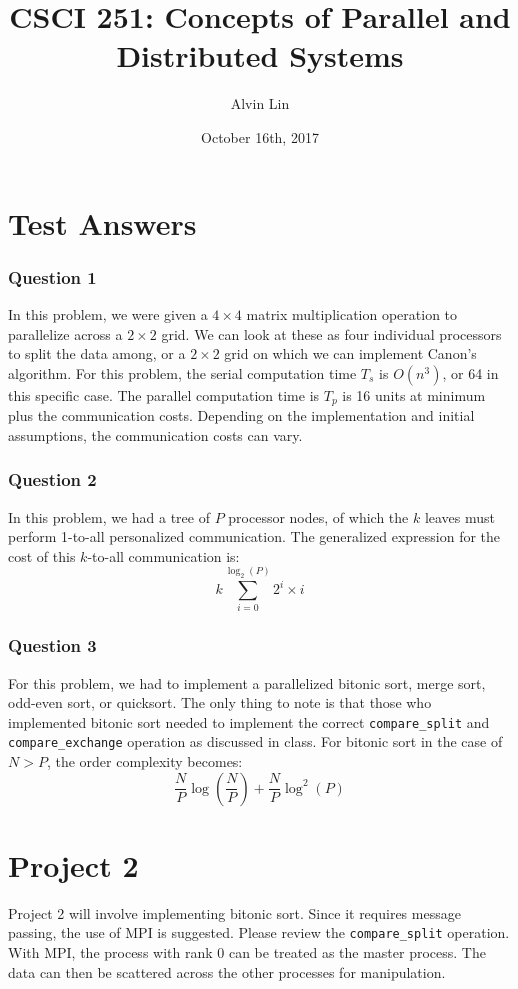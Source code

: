 \documentclass{math}
\title{CSCI 251: Concepts of Parallel and Distributed Systems}
\author{Alvin Lin}
\date{October 16th, 2017}
\begin{document}
\maketitle

\section*{Test Answers}

\subsubsection*{Question 1}
In this problem, we were given a \( 4\times4 \) matrix multiplication operation
to parallelize across a \( 2\times2 \) grid. We can look at these as four
individual processors to split the data among, or a \( 2\times2 \) grid on which
we can implement Canon's algorithm. For this problem, the serial computation
time \( T_s \) is \( O(n^3) \), or 64 in this specific case. The parallel
computation time is \( T_p \) is 16 units at minimum plus the communication
costs. Depending on the implementation and initial assumptions, the
communication costs can vary.

\subsubsection*{Question 2}
In this problem, we had a tree of \( P \) processor nodes, of which the
\( k \) leaves must perform 1-to-all personalized communication. The
generalized expression for the cost of this \( k \)-to-all communication is:
\[ k\sum_{i=0}^{\log_2(P)}2^i\times i \]

\subsubsection*{Question 3}
For this problem, we had to implement a parallelized bitonic sort, merge sort,
odd-even sort, or quicksort. The only thing to note is that those who
implemented bitonic sort needed to implement the correct \texttt{compare\_split}
and \texttt{compare\_exchange} operation as discussed in class. For bitonic
sort in the case of \( N > P \), the order complexity becomes:
\[ \frac{N}{P}\log(\frac{N}{P})+\frac{N}{P}\log^2(P) \]

\section*{Project 2}
Project 2 will involve implementing bitonic sort. Since it requires message
passing, the use of MPI is suggested. Please review the \texttt{compare\_split}
operation. With MPI, the process with rank 0 can be treated as the master
process. The data can then be scattered across the other processes for
manipulation.
\end{document}
